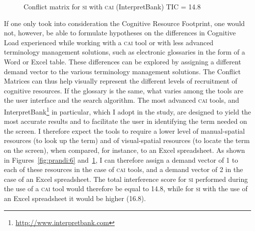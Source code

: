 \documentclass[output=paper]{langsci/langscibook}
\begin{document}
\begin{figure}[p]
{}
\caption{Conflict matrix for \textsc{si} with \textsc{cai} (InterpretBank) TIC = 14.8\label{fig:prandi:7}
}
\end{figure}

If one only took into consideration the Cognitive Resource Footprint, one would not, however, be able to formulate hypotheses on the differences in Cognitive Load experienced while working with a \textsc{cai} tool or with less advanced terminology management solutions, such as electronic glossaries in the form of a Word or Excel table. These differences can be explored by assigning a different demand vector to the various terminology management solutions. The Conflict Matrices can thus help visually represent the different levels of recruitment of cognitive resources. If the glossary is the same, what varies among the tools are the user interface and the search algorithm. The most advanced \textsc{cai} tools, and InterpretBank\footnote{\url{http://www.interpretbank.com}} in particular, which I adopt in the study, are designed to yield the most accurate results and to facilitate the user in identifying the term needed on the screen. I therefore expect the tools to require a lower level of manual-spatial resources (to look up the term) and of visual-spatial resources (to locate the term on the screen), when compared, for instance, to an Excel spreadsheet. As shown in Figures~\ref{fig:prandi:6} and~\ref{fig:prandi:7}, I can therefore assign a demand vector of 1 to each of these resources in the case of \textsc{cai} tools, and a demand vector of 2 in the case of an Excel spreadsheet. The total interference score for \textsc{si} performed during the use of a \textsc{cai} tool would therefore be equal to 14.8, while for \textsc{si} with the use of an Excel spreadsheet it would be higher (16.8).
\end{document}

